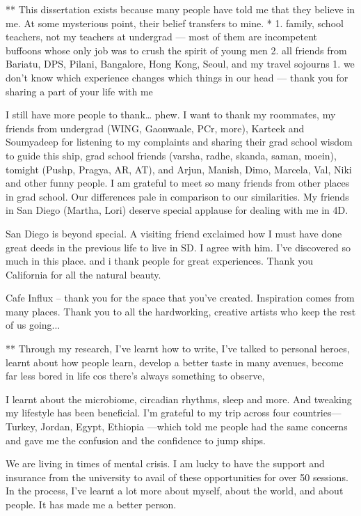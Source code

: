 \begin{frontmatter}
\begin{acknowledgements}
**
This dissertation exists because many people have told me that they believe in me. At some mysterious point, their belief transfers to mine. *   1. family, school teachers, not my teachers at undergrad — most of them are incompetent buffoons whose only job was to crush the spirit of young men
2. all friends from Bariatu, DPS, Pilani, Bangalore, Hong Kong, Seoul, and my travel sojourns
    1. we don’t know which experience changes which things in our head — thank you for sharing a part of your life with me 

I still have more people to thank… phew. I want to thank my roommates, my friends from undergrad (WING, Gaonwaale, PCr, more), Karteek and Soumyadeep for listening to my complaints and sharing their grad school wisdom to guide this ship, grad school friends (varsha, radhe, skanda, saman, moein), tomight (Pushp, Pragya, AR, AT), and Arjun, Manish, Dimo, Marcela, Val, Niki and other funny people. I am grateful to meet so many friends from other places in grad school. Our differences pale in comparison to our similarities. My friends in San Diego (Martha, Lori)  deserve special applause for dealing with me in 4D.

San Diego is beyond special. A visiting friend exclaimed how I must have done great deeds in the previous life to live in SD. I agree with him. I’ve discovered so much in this place. and i thank people for great experiences. Thank you California for all the natural beauty. 

Cafe Influx -- thank you for the space that you’ve created. Inspiration comes from many places. Thank you to all the hardworking, creative artists who keep the rest of us going...

**
Through my research, I’ve learnt how to write, I’ve talked to personal heroes, learnt about how people learn, develop a better taste in many avenues, become far less bored in life cos there’s always something to observe, 

I learnt about the microbiome, circadian rhythms, sleep and more. And tweaking my lifestyle has been beneficial. I’m grateful to my trip across four countries---Turkey, Jordan, Egypt, Ethiopia ---which told me people had the same concerns and gave me the confusion and the confidence to jump ships.

We are living in times of mental crisis. I am lucky to have the support and insurance from the university to avail of these opportunities for over 50 sessions. In the process, I’ve learnt a lot more about myself, about the world, and about people. It has made me a better person.


\end{acknowledgements}
\end{frontmatter}
